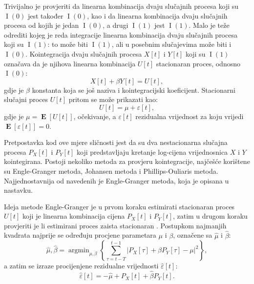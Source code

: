 \documentclass[lmodern, utf8, diplomski, numeric]{fer}
\newcommand{\E}[1]{\operatorname{\mathbf{E}}\q[#1\w]}
\newcommand{\I}[1]{\operatorname{\mathrm{I}}\q(#1\w)}
\newcommand{\q}{\left}
\newcommand{\w}{\right}
\DeclareMathOperator*{\argmin}{arg\min}
\begin{document}
  Trivijalno je provjeriti da linearna kombinacija dvaju slučajnih procesa koji su $\I{0}$ jest također $\I{0}$, kao i da linearna kombinacija dvaju slučajnih procesa od kojih je jedan $\I{0}$, a drugi $\I{1}$ jest $\I{1}$.
  Malo je teže odrediti kojeg je reda integracije linearna kombinacija dvaju slučajnih procesa koji su $\I{1}$: to može biti $\I{1}$, ali u posebnim slučajevima može biti i $\I{0}$.
  Kointegracija dvaju slučajnih procesa $X\q[t\w]$ i $Y\q[t\w]$ koji su $\I{1}$ označava da je njihova linearna kombinacija $U\q[t\w]$ stacionaran proces, odnosno $\I{0}$:
  \begin{equation}
  X\q[t\w] + \beta Y\q[t\w] = U\q[t\w],
  \end{equation}
  gdje je $\beta$ konstanta koja se još naziva i kointegracijski koeficijent.
  Stacionarni slučajni proces $U\q[t\w]$ pritom se može prikazati kao:
  \begin{equation}
  U\q[t\w] = \mu + \varepsilon\q[t\w],
  \end{equation}
  gdje je $\mu = \E{U\q[t\w]}$, očekivanje, a $\varepsilon\q[t\w]$ rezidualna vrijednost za koju vrijedi $\E{\varepsilon\q[t\w]} = 0$.
  
  Pretpostavka kod ove mjere sličnosti jest da su dva nestacionarna slučajna procesa $P_X\q[t\w]$ i $P_Y\q[t\w]$ koji predstavljaju kretanje log-cijena vrijednosnica $X$ i $Y$ kointegirana.
  Postoji nekoliko metoda za provjeru kointegracije, najčešće korištene su Engle-Granger metoda, Johansen metoda i Phillips-Ouliaris metoda.
  Najjednostavnija od navedenih je Engle-Granger metoda, koja je opisana u nastavku.
  
  Ideja metode Engle-Granger je u prvom koraku estimirati stacionaran proces $U\q[t\w]$ koji je linearna kombinacija cijena $P_X\q[t\w]$ i $P_Y\q[t\w]$, zatim u drugom koraku provjeriti je li estimirani proces zaista stacionaran \citep{engle-granger}.
  Postupkom najmanjih kvadrata najprije se određuju procjene parametara $\mu$ i $\beta$, označene sa $\hat{\mu}$ i $\hat{\beta}$:
  \begin{equation}
  \hat{\mu}, \hat{\beta} = \argmin_{\mu, \beta} \q\{\sum_{\tau = t - T}^{t - 1} \q \lvert P_X\q[\tau\w] + \beta P_Y\q[\tau\w] -\mu \w \rvert^2\w\},
  \end{equation}
  a zatim se izraze procijenjene rezidualne vrijednosti $\hat{\varepsilon}\q[t\w]$:
  \begin{equation}
  \hat{\varepsilon}\q[t\w] = -\hat{\mu} + P_X\q[t\w] + \hat{\beta} P_Y\q[t\w].
  \end{equation}
  
\end{document}
